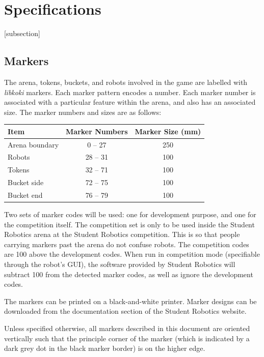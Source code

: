 \section{Specifications}
\label{sec:Specifications}

[subsection]
\newcommand{\rcnii}{\stepcounter{rulei}\arabic{section}.\arabic{subsection}.\arabic{rulei}}
\renewcommand{\labelenumi}{\rcnii}

\subsection{Markers}
\label{sub:markers}
The arena, tokens, buckets, and robots involved in the game are labelled with \textit{libkoki} markers.  Each marker pattern encodes a number.  Each marker number is associated with a particular feature within the arena, and also has an associated size.  The marker numbers and sizes are as follows:

\begin{center}
  \begin{tabular}{lcc}
    \toprule
    \textbf{Item} & \textbf{Marker Numbers} & \textbf{Marker Size (mm)} \\
    \midrule
    Arena boundary & 0 -- 27 & 250 \\
    Robots & 28 -- 31 & 100 \\
    Tokens & 32 -- 71 & 100 \\
    Bucket side & 72 -- 75 & 100 \\
    Bucket end & 76 -- 79 & 100 \\
    \bottomrule
  \end{tabular}
\end{center}

Two sets of marker codes will be used: one for development purpose, and one for the competition itself.  The competition set is only to be used inside the Student Robotics arena at the Student Robotics competition.  This is so that people carrying markers past the arena do not confuse robots.  The competition codes are 100 above the development codes.  When run in competition mode (specifiable through the robot's GUI), the software provided by Student Robotics will subtract 100 from the detected marker codes, as well as ignore the development codes.

The markers can be printed on a black-and-white printer.  Marker designs can be downloaded from the documentation section of the Student Robotics website.

Unless specified otherwise, all markers described in this document are oriented vertically such that the principle corner of the marker (which is indicated by a dark grey dot in the black marker border) is on the higher edge.


